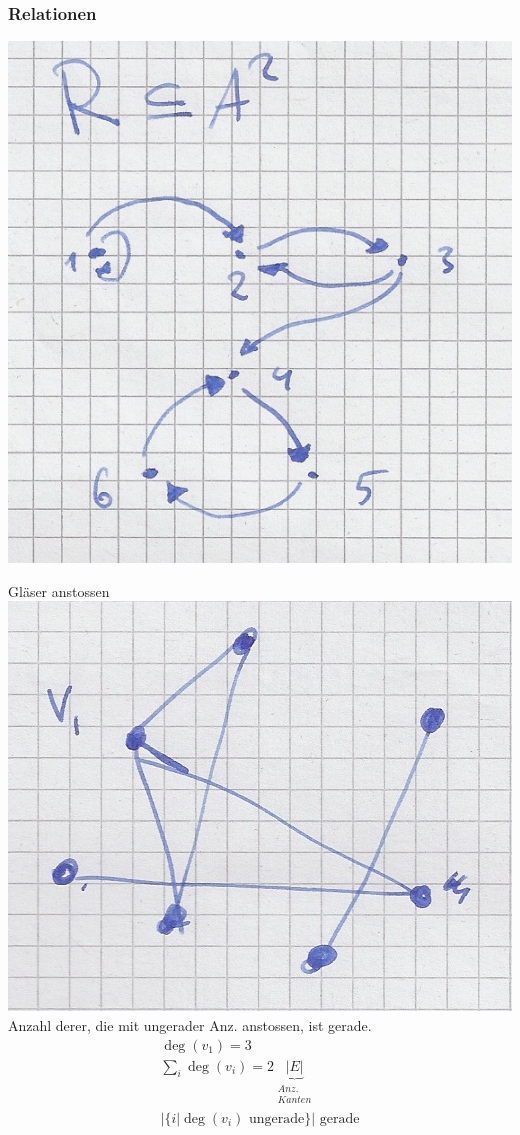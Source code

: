 \subsubsection{Relationen}
\includegraphics{Bild29} \\
\begin{bsp*}
	Gläser anstossen \\
	\includegraphics{Bild30} \\
	Anzahl derer, die mit ungerader Anz. anstossen, ist gerade.
	\begin{gather*}
		\deg(v_1) = 3 \\
		\sum_i \deg(v_i) = 2\underbrace{|E|}_{\substack{Anz.\\Kanten}} \\
		|\{i | \deg(v_i) \text{ ungerade}\}| \text{ gerade}
	\end{gather*}
\end{bsp*}
